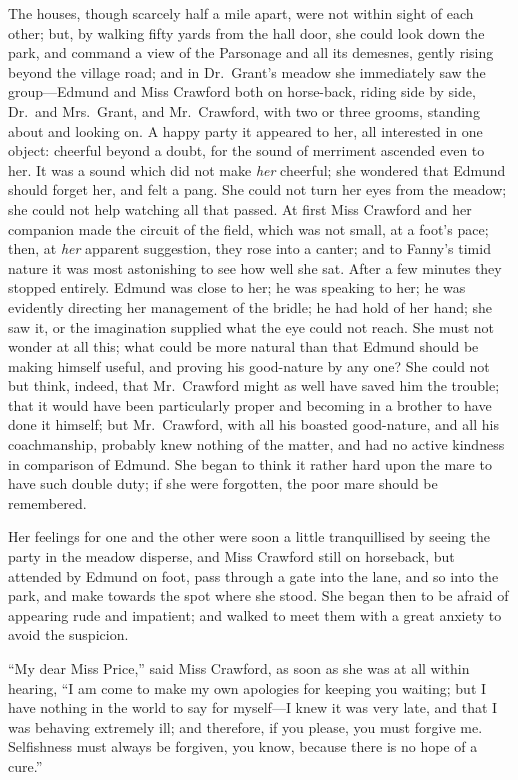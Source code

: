 The houses, though scarcely half a mile apart, were not
within sight of each other; but, by walking fifty yards
from the hall door, she could look down the park,
and command a view of the Parsonage and all its demesnes,
gently rising beyond the village road; and in Dr.\ Grant's
meadow she immediately saw the group---Edmund and Miss
Crawford both on horse-back, riding side by side, Dr.\ and
Mrs.\ Grant, and Mr.\ Crawford, with two or three grooms,
standing about and looking on.  A happy party it appeared
to her, all interested in one object:  cheerful beyond
a doubt, for the sound of merriment ascended even to her.
It was a sound which did not make \emph{her} cheerful;
she wondered that Edmund should forget her, and felt
a pang.  She could not turn her eyes from the meadow;
she could not help watching all that passed.  At first Miss
Crawford and her companion made the circuit of the field,
which was not small, at a foot's pace; then, at \emph{her}
apparent suggestion, they rose into a canter; and to Fanny's
timid nature it was most astonishing to see how well
she sat.  After a few minutes they stopped entirely.
Edmund was close to her; he was speaking to her;
he was evidently directing her management of the bridle;
he had hold of her hand; she saw it, or the imagination
supplied what the eye could not reach.  She must not
wonder at all this; what could be more natural than that
Edmund should be making himself useful, and proving his
good-nature by any one?  She could not but think, indeed,
that Mr.\ Crawford might as well have saved him the trouble;
that it would have been particularly proper and becoming
in a brother to have done it himself; but Mr.\ Crawford,
with all his boasted good-nature, and all his coachmanship,
probably knew nothing of the matter, and had no active
kindness in comparison of Edmund. She began to think it
rather hard upon the mare to have such double duty;
if she were forgotten, the poor mare should be remembered.

Her feelings for one and the other were soon a little
tranquillised by seeing the party in the meadow disperse,
and Miss Crawford still on horseback, but attended by Edmund
on foot, pass through a gate into the lane, and so into
the park, and make towards the spot where she stood.
She began then to be afraid of appearing rude and impatient;
and walked to meet them with a great anxiety to avoid
the suspicion.

``My dear Miss Price,'' said Miss Crawford, as soon as she
was at all within hearing, ``I am come to make my own
apologies for keeping you waiting; but I have nothing
in the world to say for myself---I knew it was very late,
and that I was behaving extremely ill; and therefore,
if you please, you must forgive me.  Selfishness must
always be forgiven, you know, because there is no hope
of a cure.''

